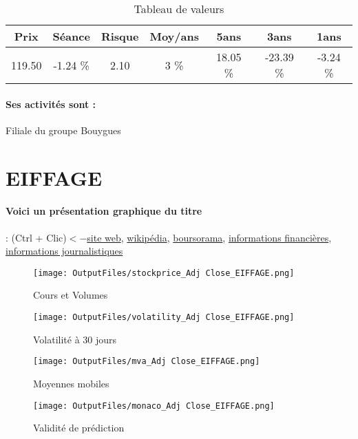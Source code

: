 \documentclass[11pt,a4paper]{report}%
\begin{document}
\begin{table}[H]
  \centering
    \begin{tabular}{|c|c|c|c|c|c|c|}
    \hline
    Prix & Séance & Risque  & Moy/ans & 5ans & 3ans & 1ans \\
    \hline
    119.50 &    -1.24 \%    & 2.10 & 3 \% & 18.05 \% & -23.39 \% & -3.24 \% \\
    \hline
    \end{tabular}%
        \label{tab:table_COLAS}%
      \caption{Tableau de valeurs}
\end{table}%

\paragraph{Ses activités sont : } Filiale du groupe Bouygues 
    
    \newpage

\section{EIFFAGE}

\paragraph{Voici un présentation graphique du titre} : (Ctrl + Clic)$<-$\href{https://www.eiffage.com/finance/action-eiffage}{site web}, \href{https://fr.wikipedia.org/wiki/Eiffage}{wikipédia}, \href{https://www.boursorama.com/cours/1rPFGR}{boursorama}, \href{https://www.qwant.com/?q=site:https:%2f%2fwww.easybourse.com%2faction-societe%2fEIFFAGE&t=web&client=ext-firefox-hp}{informations financières}, \href{https://bourse.lerevenu.com/cours-de-bourse/fiche-valeur-synthese/EIFFAGE/FGR-FR}{informations journalistiques}
\begin{figure}[!htb]
   \begin{minipage}{0.5\textwidth}
     \centering
     \texttt{[image: OutputFiles/stockprice\_Adj Close\_EIFFAGE.png]}
     \caption{Cours et Volumes}\label{Fig:price_EIFFAGE}
   \end{minipage}\hfill
   \begin{minipage}{0.5\textwidth}
     \centering
     \texttt{[image: OutputFiles/volatility\_Adj Close\_EIFFAGE.png]}
     \caption{Volatilité à 30 jours}\label{Fig:volat_EIFFAGE}
   \end{minipage}
\end{figure}
\begin{figure}[!htb]
   \begin{minipage}{0.5\textwidth}
     \centering
     \texttt{[image: OutputFiles/mva\_Adj Close\_EIFFAGE.png]}
     \caption{Moyennes mobiles}\label{Fig:mva_EIFFAGE}
   \end{minipage}\hfill
   \begin{minipage}{0.5\textwidth}
     \centering
     \texttt{[image: OutputFiles/monaco\_Adj Close\_EIFFAGE.png]}
     \caption{Validité de prédiction}\label{Fig:prediction_EIFFAGE}
   \end{minipage}
\end{figure}
\end{document}
